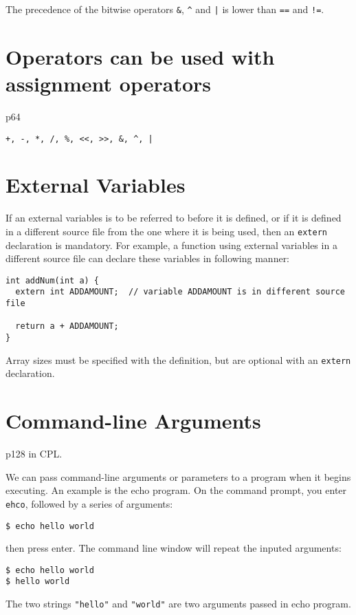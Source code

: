 \documentclass[12pt]{article}
\begin{document}
The precedence of the bitwise operators \texttt{\&}, \texttt{\textasciicircum{}} and \texttt{|} is lower than \texttt{==} and \texttt{!=}.
\section{Operators can be used with assignment operators}
\label{sec:orgaa5edb3}
p64

\texttt{+, -, *, /, \%, <<, >>, \&, \textasciicircum{}, |}
\section{External Variables}
\label{sec:orgd7d27e4}
If an external variables is to be referred to before it is defined, or if it is defined in a different source file from the one where it is being used, then an \texttt{extern} declaration is mandatory. For example, a function using external variables in a different source file can declare these variables in following manner:
\begin{verbatim}
int addNum(int a) {
  extern int ADDAMOUNT;  // variable ADDAMOUNT is in different source file

  return a + ADDAMOUNT;
}
\end{verbatim}
Array sizes must be specified with the definition, but are optional with an \texttt{extern} declaration.
\section{Command-line Arguments}
\label{sec:orgc514194}
p128 in CPL.

We can pass command-line arguments or parameters to a program when it begins executing. An example is the echo program. On the command prompt, you enter \texttt{ehco}, followed by a series of arguments:
\begin{verbatim}
$ echo hello world
\end{verbatim}
then press enter. The command line window will repeat the inputed arguments:
\begin{verbatim}
$ echo hello world
$ hello world
\end{verbatim}
The two strings \texttt{"hello"} and \texttt{"world"} are two arguments passed in echo program.
\end{document}
